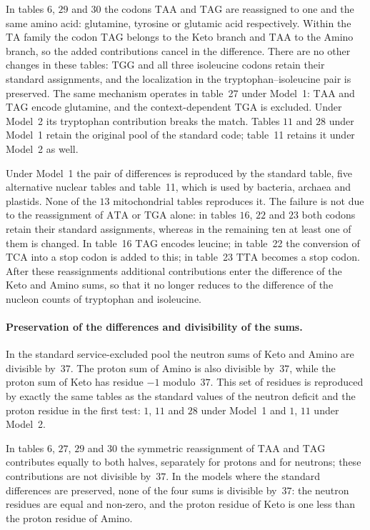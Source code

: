 \documentclass[11pt,a4paper]{article}
\renewcommand{\_}{\origunderscore\allowbreak}
\begin{document}
In tables $6$, $29$ and $30$ the codons $\mathrm{TAA}$ and
$\mathrm{TAG}$ are reassigned
to one and the same amino acid: glutamine, tyrosine or glutamic
acid respectively. Within the $\mathrm{TA}$ family the codon
$\mathrm{TAG}$ belongs to
the Keto branch and $\mathrm{TAA}$ to the Amino branch, so the
added
contributions cancel in the difference. There are no other changes
in these tables: $\mathrm{TGG}$ and all three isoleucine codons
retain their
standard assignments, and the localization in the
tryptophan--isoleucine pair is preserved. The same mechanism
operates in table~27 under Model~1: $\mathrm{TAA}$ and
$\mathrm{TAG}$ encode glutamine,
and the context-dependent $\mathrm{TGA}$ is excluded. Under
Model~2 its
tryptophan contribution breaks the match. Tables $11$ and $28$
under Model~1 retain the original pool of the standard code;
table~11 retains it under Model~2 as well.

Under Model~1 the pair of differences is reproduced by the
standard table, five alternative nuclear tables and table~11,
which is used by bacteria, archaea and plastids. None of the $13$
mitochondrial tables reproduces it. The failure is not due to the
reassignment of $\mathrm{ATA}$ or $\mathrm{TGA}$ alone: in tables
$16$, $22$ and $23$ both
codons retain their standard assignments, whereas in the remaining
ten at least one of them is changed. In table~16 $\mathrm{TAG}$
encodes
leucine; in table~22 the conversion of $\mathrm{TCA}$ into a stop
codon is
added to this; in table~23 $\mathrm{TTA}$ becomes a stop codon.
After these
reassignments additional contributions enter the difference of the
Keto and Amino sums, so that it no longer reduces to the
difference of the nucleon counts of tryptophan and isoleucine.

\paragraph{Preservation of the differences and divisibility of the sums.}
In the standard service-excluded pool the neutron sums of Keto and
Amino are divisible by~$37$. The proton sum of Amino is also
divisible by~$37$, while the proton sum of Keto has residue $-1$
modulo~$37$. This set of residues is reproduced by exactly the
same
tables as the standard values of the neutron deficit and the
proton residue in the first test: $1$, $11$ and $28$ under Model~1
and $1$, $11$ under Model~2.

In tables $6$, $27$, $29$ and $30$ the symmetric reassignment of
$\mathrm{TAA}$
and $\mathrm{TAG}$ contributes equally to both halves, separately
for protons
and for neutrons; these contributions are not divisible by~$37$.
In
the models where the standard differences are preserved, none of
the four sums is divisible by~$37$: the neutron residues are equal
and non-zero, and the proton residue of Keto is one less than the
proton residue of Amino.
\end{document}
